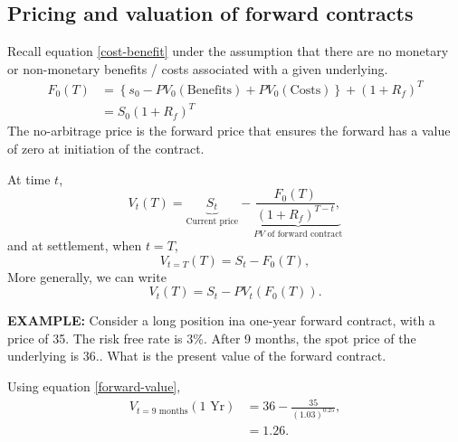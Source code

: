 \documentclass[../notes_compiled.tex]{subfiles}
\begin{document}
\subsection{Pricing and valuation of forward contracts}
\begin{itemize}
\item Recall equation \ref{cost-benefit} under the assumption that there are no monetary or non-monetary benefits / costs associated with a given underlying.
\begin{align}
F_{0}(T) &= \left\{ s_{0} - PV_{0}(\text{Benefits}) + PV_{0}(\text{Costs}) \right\} + (1+R_{f})^{T} \nonumber \\
&= S_{0}(1+R_{f})^{T}
\end{align}
The no-arbitrage price is the forward price that ensures the forward has a value of zero at initiation of the contract.
\item[] At time $t$, 
\begin{equation}
V_{t}(T) = \underbrace{S_{t}}_{\text{Current price}} - \underbrace{\frac{F_{0}(T)}{(1+R_{f})^{T-t}},}_{\text{$PV$ of forward contract}}
\end{equation}
and at settlement, when $t=T$,
\begin{equation}
V_{t=T}(T) = S_{t} - F_{0}(T),
\end{equation}
More generally, we can write
\begin{equation}
V_{t}(T) = S_{t} - PV_{t}(F_{0}(T)). \label{forward-value}
\end{equation}
{\color{RedViolet}
\item[] \textbf{EXAMPLE:} Consider a long position ina one-year forward contract, with a price of 35. The risk free rate is 3\%. After 9 months, the spot price of the underlying is 36.. What is the present value of the forward contract.
}
{\color{RoyalBlue}
\item[] Using equation \ref{forward-value},
\begin{align}
V_{t = \text{9 months}}(\text{1 Yr}) &= 36 - \frac{35}{(1.03)^{0.25}}, \\
&=1.26.
\end{align}
}
\end{itemize}
\end{document}
